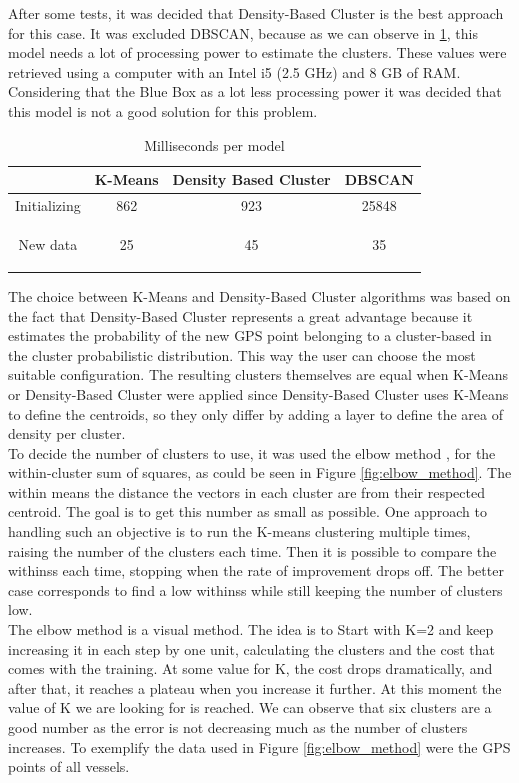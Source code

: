 After some tests, it was decided that Density-Based Cluster is the best approach for this case. It was excluded DBSCAN, because as we can observe in \ref{table:mill_per_moodle}, this model needs a lot of processing power to estimate the clusters. These values were retrieved using a computer with an Intel i5 (2.5 GHz) and 8 GB of RAM. Considering that the Blue Box as a lot less processing power it was decided that this model is not a good solution for this problem.
\\

\begin {table}[H]
\begin{center}
\begin{tabular}{c|c|c|c}
             & \textbf{K-Means} & \textbf{Density Based Cluster} & \textbf{DBSCAN} \\
\hline
Initializing & 862              & 923                             & 25848           \\

New data     & 25               & 45                            & 35  
           
\label{table:mill_per_moodle}
\end{tabular}
\caption {Milliseconds per model}
\end{center}
\end {table}

The choice between K-Means and Density-Based Cluster algorithms was based on the fact that Density-Based Cluster represents a great advantage because it estimates the probability of the new GPS point belonging to a cluster-based in the cluster probabilistic distribution. This way the user can choose the most suitable configuration. The resulting clusters themselves are equal when K-Means or Density-Based Cluster were applied since Density-Based Cluster uses K-Means to define the centroids, so they only differ by adding a layer to define the area of density per cluster.
\\
To decide the number of clusters to use, it was used the elbow method \cite{Kodinariya2013ReviewOD}, for the within-cluster sum of squares, as could be seen in Figure \ref{fig:elbow_method}. The within means the distance the vectors in each cluster are from their respected centroid. The goal is to get this number as small as possible. One approach to handling such an objective is to run the K-means clustering multiple times, raising the number of the clusters each time. Then it is possible to compare the withinss each time, stopping when the rate of improvement drops off. The better case corresponds to find a low withinss while still keeping the number of clusters low.\\
The elbow method is a visual method. The idea is to Start with K=2 and keep increasing it in each step by one unit, calculating the clusters and the cost that comes with the training. At some value for K, the cost drops dramatically, and after that, it reaches a plateau when you increase it further. At this moment the value of K we are looking for is reached. We can observe that six clusters are a good number as the error is not decreasing much as the number of clusters increases. To exemplify the data used in Figure \ref{fig:elbow_method} were the GPS points of all vessels.


